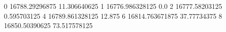0 16788.29296875 11.306640625
1 16776.986328125 0.0
2 16777.58203125 0.595703125
4 16789.861328125 12.875
6 16814.763671875 37.77734375
8 16850.50390625 73.517578125
